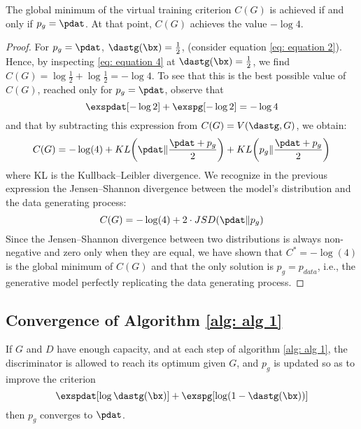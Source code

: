 \begin{theorem}
	The global minimum of the virtual training criterion $C(G)$ is achieved if and only if $p_g=\pdat$. At that point, $C(G)$ achieves the value $-\log4$.\label{thm: theorem 1}
\end{theorem}

\begin{proof}
	For $p_g=\pdat$, $\dastg(\bx)=\frac{1}{2}$, (consider equation \ref{eq: equation 2}). Hence, by inspecting \ref{eq: equation 4}	at $\dastg(\bx)=\frac{1}{2}$, we find $C(G)=\log\frac{1}{2}+\log\frac{1}{2}=-\log4$. To see that this is the best possible value of $C(G)$, reached only for $p_g=\pdat$, observe that
	\begin{equation*}
		\exspdat[-\log2]+\exspg[-\log2]=-\log4
	\end{equation*}
	and that by subtracting this expression from $C(G)=V(\dastg,G)$, we obtain:
	\begin{equation}
		C(G)=-\log(4)+KL\bigg(\pdat\Vert\frac{\pdat+p_g}{2}\bigg)+KL\bigg(p_g\Vert\frac{\pdat+p_g}{2}\bigg)
	\end{equation}
	where KL is the Kullback–Leibler divergence. We recognize in the previous expression the Jensen–Shannon divergence between the model’s distribution and the data generating process:
	\begin{equation}
		C(G)=-\log(4)+2\cdot JSD(\pdat\Vert p_g)
	\end{equation}
	Since the Jensen–Shannon divergence between two distributions is always non-negative and zero only when they are equal, we have shown that $C^{\ast}=-\log(4)$ is the global minimum of $C(G)$ and that the only solution is $p_g=p_{data}$, i.e., the generative model perfectly replicating the data generating process.
\end{proof}

\subsection{Convergence of Algorithm \ref{alg: alg 1}}\label{sec: convergence}
\begin{proposition}
	If $G$ and $D$ have enough capacity, and at each step of algorithm \ref{alg: alg 1}, the discriminator is allowed to reach its optimum given $G$, and $p_g$ is updated so as to improve the criterion
	\begin{equation*}
		\exspdat[\log\dastg(\bx)] + \exspg[\log(1-\dastg(\bx))]
	\end{equation*}
	then $p_g$ converges to $\pdat$.
\end{proposition}

